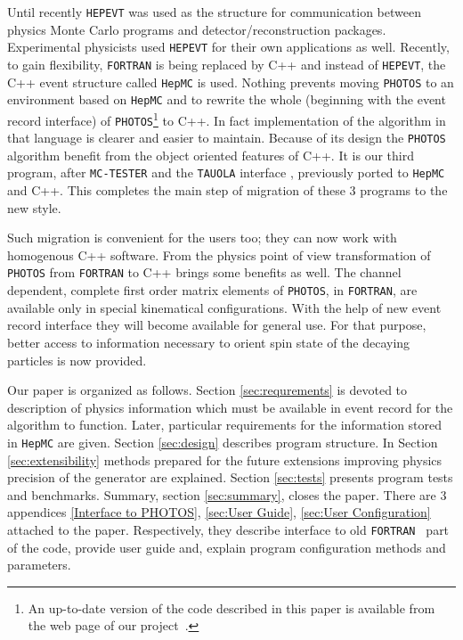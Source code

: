 \documentclass[]{Photos_interface_design}
\begin{document}
Until recently {\tt HEPEVT} \cite{Altarelli:1989wu} was used as the structure for 
communication between physics Monte Carlo programs and detector/reconstruction 
packages. Experimental physicists used {\tt HEPEVT} 
for their own applications  as well. Recently, to gain  flexibility, {\tt FORTRAN} is being replaced by C++ and 
instead of {\tt HEPEVT}, the C++ event structure called {\tt HepMC} \cite{Dobbs:2001ck}
is used. Nothing prevents 
moving {\tt PHOTOS} to an environment based on  {\tt HepMC}
and to rewrite the whole (beginning with the event record interface)
of {\tt PHOTOS}\footnote{An up-to-date version of the code described in this paper is
available from the web page of our project~\cite{photosC++}. 
  }
 to C++. In fact implementation of the algorithm in that language 
is clearer and easier to
 maintain. Because of its design the {\tt PHOTOS} algorithm benefit from the object 
oriented features of C++. It is our third program, after {\tt MC-TESTER} \cite{Davidson:2008ma}
and the {\tt TAUOLA} interface \cite{Davidson:2010rw}, previously ported to {\tt HepMC} and C++.
This completes the main step of migration of these 3 programs to the new style.

Such migration is convenient for the users too; they can now work
with  homogenous C++ software. From the physics point of view transformation 
of {\tt PHOTOS} 
from {\tt FORTRAN} to C++  brings some benefits as well.
The channel dependent, complete first order matrix elements of {\tt PHOTOS}, in {\tt FORTRAN},
 are available only 
in special
kinematical configurations. With the help of new event record interface they will become
available for general use.
For that purpose, better access to information necessary to orient spin state of the decaying particles
is now provided.



Our paper is organized as follows. Section \ref{sec:requrements} is devoted
to description of physics information which must be available in event
record for the algorithm to function. Later, particular requirements for the 
information stored in {\tt HepMC} are given. Section \ref{sec:design} describes
program structure. In Section  \ref{sec:extensibility} methods prepared for the
future extensions improving physics precision of the generator are explained.
Section \ref{sec:tests} presents program tests and benchmarks. 
Summary, section \ref{sec:summary}, closes the paper.
There are 3 appendices \ref{Interface to PHOTOS}, 
\ref{sec:User Guide}, \ref{sec:User Configuration} attached to the paper.
Respectively, they describe interface to old {\tt FORTRAN } part of the code,
provide user guide and, explain program configuration methods and parameters. 
\end{document}
